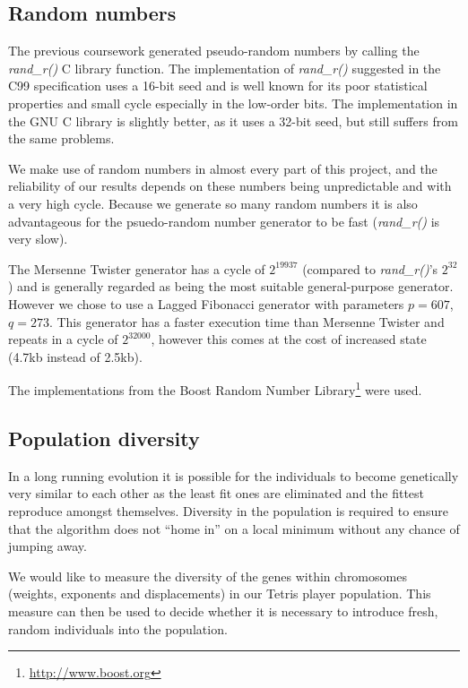 \documentclass[a4paper,11pt]{article}
\begin{document}
\subsection{Random numbers}

The previous coursework generated pseudo-random numbers by calling the
\emph{rand\_r()} C library function.
The implementation of \emph{rand\_r()} suggested in the C99 specification
\cite{C99} uses a 16-bit seed and is well known for its poor statistical
properties and small cycle especially in the low-order bits.
The implementation in the GNU C library is slightly better, as it uses a 32-bit
seed, but still suffers from the same problems.

We make use of random numbers in almost every part of this project, and the
reliability of our results depends on these numbers being unpredictable and with
a very high cycle.
Because we generate so many random numbers it is also advantageous for the
psuedo-random number generator to be fast (\emph{rand\_r()} is very slow).

The Mersenne Twister \cite{matsumoto1998mersenne} generator has a cycle of
$2^{19937}$ (compared to \emph{rand\_r()}'s $2^{32}$) and is generally regarded as
being the most suitable general-purpose generator.
However we chose to use a Lagged Fibonacci \cite{brent1992uniform} generator
with parameters $p=607$, $q=273$.
This generator has a faster execution time than Mersenne Twister and repeats in
a cycle of $2^{32000}$, however this comes at the cost of increased state (4.7kb
instead of 2.5kb).

The implementations from the Boost Random Number
Library\footnote{\url{http://www.boost.org}} were used.

\subsection{Population diversity}

In a long running evolution it is possible for the individuals to become
genetically very similar to each other as the least fit ones are eliminated and
the fittest reproduce amongst themselves.
Diversity in the population is required to ensure that the algorithm does not
``home in'' on a local minimum without any chance of jumping away.

We would like to measure the diversity of the genes within chromosomes (weights,
exponents and displacements) in our Tetris player population.
This measure can then be used to decide whether it is necessary to introduce
fresh, random individuals into the population.
\end{document}
